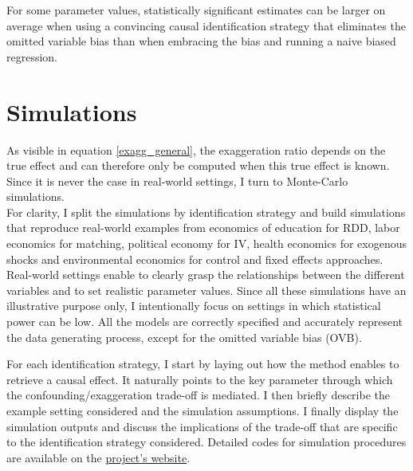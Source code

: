 \documentclass[usletter, 12pt]{article}
\begin{document}
			For some parameter values, statistically significant estimates can be larger on average when using a convincing causal identification strategy that eliminates the omitted variable bias than when embracing the bias and running a naive biased regression.	
	


				
	\section{Simulations} \label{simulations}
		
		 As visible in equation \ref{exagg_general},  the exaggeration ratio depends on the true effect and can therefore only be computed when this true effect is known. Since it is never the case in real-world settings, I turn to Monte-Carlo simulations.\\
    
    For clarity, I split the simulations by identification strategy %
    and build simulations that reproduce real-world examples from economics of education for RDD, labor economics for matching, political economy for IV, health economics for exogenous shocks and environmental economics for control and fixed effects approaches. Real-world settings enable to clearly grasp the relationships between the different variables and to set realistic parameter values. Since all these simulations have an illustrative purpose only, I intentionally focus on settings in which statistical power can be low. All the models are correctly specified and accurately represent the data generating process, except for the omitted variable bias (OVB).
    
     		For each identification strategy, I start by laying out how the method enables to retrieve a causal effect. It naturally points to the key parameter through which the confounding/exaggeration trade-off is mediated. I then briefly describe the example setting considered and the simulation assumptions. I finally display the simulation outputs and discuss the implications of the trade-off that are specific to the identification strategy considered. Detailed codes for simulation procedures are available on the \href{https://vincentbagilet.github.io/causal_inflation/}{project's website}.
		
\end{document}
